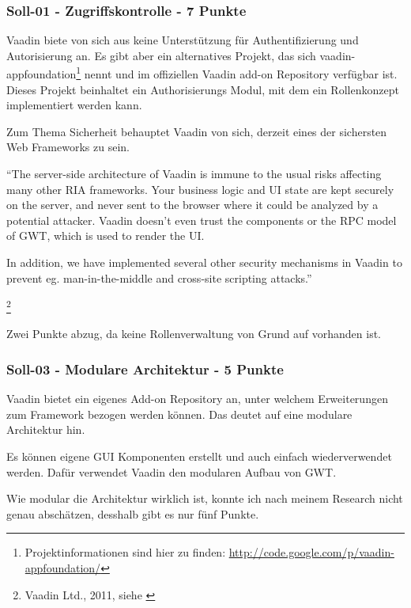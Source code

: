   \subsubsection{Soll-01 - Zugriffskontrolle - 7 Punkte}
  
  Vaadin biete von sich aus keine Unterstützung für Authentifizierung und
  Autorisierung an. Es gibt aber ein alternatives Projekt, das sich
  vaadin-appfoundation\footnote{Projektinformationen sind hier zu finden:
  \url{http://code.google.com/p/vaadin-appfoundation/}} nennt und im
  offiziellen Vaadin add-on Repository verfügbar ist. Dieses Projekt beinhaltet
  ein Authorisierungs Modul, mit dem ein Rollenkonzept implementiert werden kann.
  
  Zum Thema Sicherheit behauptet Vaadin von sich, derzeit eines der sichersten
  Web Frameworks zu sein.
  \newline
  
  \begin{itshape}``The server-side architecture of Vaadin is immune to the usual
  risks affecting many other RIA frameworks. Your business logic and UI state
  are kept securely on the server, and never sent to the browser where it could
  be analyzed by a potential attacker. Vaadin doesn't even trust the components
  or the RPC model of GWT, which is used to render the UI.

  In addition, we have implemented several other security mechanisms in Vaadin
  to prevent eg. man-in-the-middle and cross-site scripting
  attacks.''\end{itshape}
  \footnote{Vaadin Ltd., 2011, siehe \cite{VaadinSecurityAlerts}}
  \newline
  
  \noindent
  Zwei Punkte abzug, da keine Rollenverwaltung von Grund auf vorhanden ist.
  
  \subsubsection{Soll-03 - Modulare Architektur - 5 Punkte}
  
  Vaadin bietet ein eigenes Add-on Repository an, unter welchem Erweiterungen
  zum Framework bezogen werden können. Das deutet auf eine modulare Architektur
  hin.
  
  Es können eigene \ac{GUI} Komponenten erstellt und auch einfach
  wiederverwendet werden. Dafür verwendet Vaadin den modularen Aufbau von
  \ac{GWT}.
  
  Wie modular die Architektur wirklich ist, konnte ich nach meinem Research
  nicht genau abschätzen, desshalb gibt es nur fünf Punkte.
  
